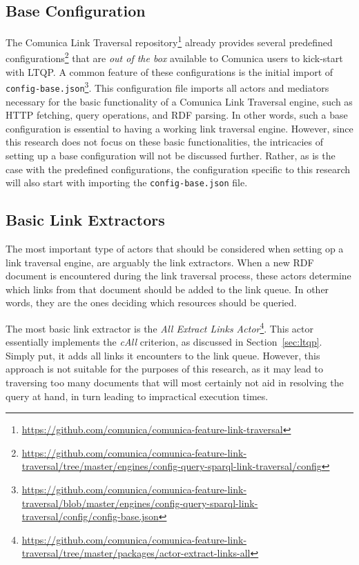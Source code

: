 \subsection{Base Configuration}

The Comunica Link Traversal repository\footnote{\url{https://github.com/comunica/comunica-feature-link-traversal}} already provides several predefined configurations\footnote{\url{https://github.com/comunica/comunica-feature-link-traversal/tree/master/engines/config-query-sparql-link-traversal/config}} that are \textit{out of the box} available to Comunica users to kick-start with LTQP. A common feature of these configurations is the initial import of \linebreak\texttt{config-base.json}\footnote{\url{https://github.com/comunica/comunica-feature-link-traversal/blob/master/engines/config-query-sparql-link-traversal/config/config-base.json}}. This configuration file imports all actors and mediators necessary for the basic functionality of a Comunica Link Traversal engine, such as HTTP fetching, query operations, and RDF parsing. In other words, such a base configuration is essential to having a working link traversal engine. However, since this research does not focus on these basic functionalities, the intricacies of setting up a base configuration will not be discussed further. Rather, as is the case with the predefined configurations, the configuration specific to this research will also start with importing the \texttt{config-base.json} file.

\subsection{Basic Link Extractors}

The most important type of actors that should be considered when setting op a link traversal engine, are arguably the link extractors. When a new RDF document is encountered during the link traversal process, these actors determine which links from that document should be added to the link queue. In other words, they are the ones deciding which resources should be queried.

The most basic link extractor is the \textit{All Extract Links Actor}\footnote{\url{https://github.com/comunica/comunica-feature-link-traversal/tree/master/packages/actor-extract-links-all}}. This actor essentially implements the \textit{cAll} criterion, as discussed in Section~\ref{sec:ltqp}. Simply put, it adds all links it encounters to the link queue. However, this approach is not suitable for the purposes of this research, as it may lead to traversing too many documents that will most certainly not aid in resolving the query at hand, in turn leading to impractical execution times.

